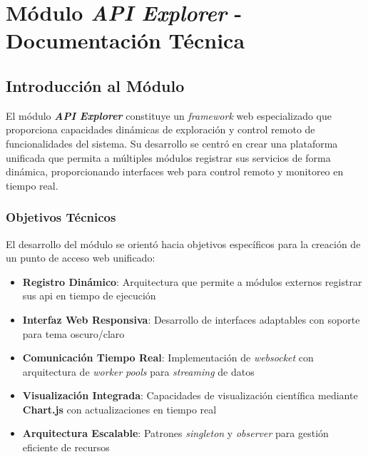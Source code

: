 {
\titlespacing*{\chapter}{0pt}{-0.1\textheight}{30pt}
\chapter[Documentación Técnica \textit{\textbf{API Explorer}}]{Módulo \textit{\textbf{API Explorer}} - Documentación Técnica}
\label{chap:anexo_api_explorer}
}

\section{Introducción al Módulo}
\label{sec:intro_api_explorer}

El módulo \textbf{\textit{API Explorer}} constituye un \textit{\gls{framework}} web especializado que proporciona capacidades dinámicas de exploración y control remoto de funcionalidades del sistema. Su desarrollo se centró en crear una plataforma unificada que permita a múltiples módulos registrar sus servicios de forma dinámica, proporcionando interfaces web para control remoto y monitoreo en tiempo real.

\subsection{Objetivos Técnicos}
\label{subsec:objetivos_api_explorer}

El desarrollo del módulo se orientó hacia objetivos específicos para la creación de un punto de acceso web unificado:

\begin{itemize}
    \item \textbf{Registro Dinámico}: Arquitectura que permite a módulos externos registrar sus \acrshort{api} en tiempo de ejecución
    \item \textbf{Interfaz Web Responsiva}: Desarrollo de interfaces adaptables con soporte para tema oscuro/claro
    \item \textbf{Comunicación Tiempo Real}: Implementación de \textit{\gls{websocket}} con arquitectura de \textit{\gls{worker}} \textit{pools} para \textit{streaming} de datos
    \item \textbf{Visualización Integrada}: Capacidades de visualización científica mediante \textbf{Chart.js} con actualizaciones en tiempo real
    \item \textbf{Arquitectura Escalable}: Patrones \textit{singleton} y \textit{observer} para gestión eficiente de recursos
\end{itemize}

